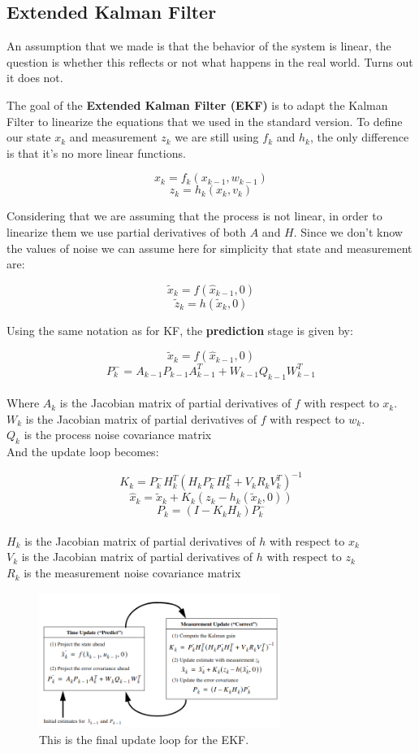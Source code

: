 \subsection{Extended Kalman Filter}

An assumption that we made is that the behavior of the system is linear, the question is whether this reflects or not what happens in the real world. Turns out it does not.

The goal of the \textbf{Extended Kalman Filter (EKF)} is to adapt the Kalman Filter to linearize the equations that we used in the standard version. To define our state $x_k$ and measurement $z_k$ we are still using  $f_k$ and $h_k$, the only difference is that it's no more linear functions.

\[
  x_k = f_k(x_{k-1}, w_{k-1})  
\]
\[
    z_k = h_k(x_k, v_k)    
\]

Considering that we are assuming that the process is not linear, in order to linearize them we use partial derivatives of both $A$ and $H$. Since we don't know the values of noise we can assume here for simplicity that state and measurement are:

\[
    \tilde{x}_k = f(\hat{x}_{k-1},0)    
\]
\[
    \tilde{z}_k =  h(\tilde{x}_k,0)   
\]

Using the same notation as for KF, the \textbf{prediction} stage is given by:

\[
    \tilde{x}_k = f(\hat{x}_{k-1},0)    
\]
\[
    P^-_k = A_{k-1}P_{k-1}A^T_{k-1}+W_{k-1}Q_{k-1}W^T_{k-1}    
\]
\\
Where $A_k$ is the Jacobian matrix of partial derivatives of $f$ with respect to $x_k$.\\
$W_k$ is the Jacobian matrix of partial derivatives of $f$ with respect to $w_k$.\\
$Q_k$ is the process noise covariance matrix
\\
And the update loop becomes:

\[
    K_k = P^-_kH^T_k(H_kP^-_kH^T_k+V_kR_kV^T_k)^{-1}    
\]
\[
    \hat{x}_k = \tilde{x}_k+K_k(z_k-h_k(\tilde{x}_k,0))
\]
\[
    P_k=(I-K_kH_k)P^-_k    
\]
\\
$H_k$ is the Jacobian matrix of partial derivatives of $h$ with respect
to $x_k$
\\
$V_k$ is the Jacobian matrix of partial derivatives of $h$ with respect
to $z_k$
\\
$R_k$ is the measurement noise covariance matrix

\begin{figure}[H]
    \centering
    \includegraphics[width=0.7\textwidth]{Figures/update.png}
    \caption{This is the final update loop for the EKF.}
    \label{img:update}
\end{figure}

